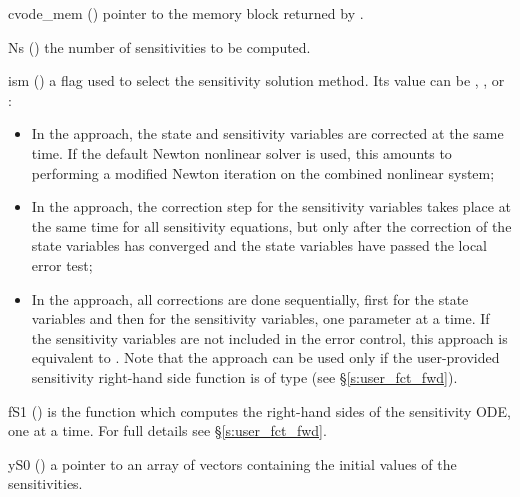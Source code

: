 {
  \begin{args}

  \item[cvode\_mem] ()
    pointer to the {\cvodes} memory block returned by .

  \item[Ns] () 
    the number of sensitivities to be computed.

  \item[ism] ()
    a flag used to select the sensitivity solution method. Its value can 
    be , , or :
    \begin{itemize}
    \item In the  approach, the state and sensitivity
      variables are corrected at the same time. If the default Newton nonlinear
      solver is used, this amounts to performing a modified Newton iteration on
      the combined nonlinear system;
    \item In the  approach, the correction step for the sensitivity
      variables takes place at the same time for all sensitivity equations, but only after 
      the correction of the state variables has converged and the state variables 
      have passed the local error test; 
    \item In the  approach, all corrections are done sequentially, first
      for the state variables and then for the sensitivity variables, one parameter at
      a time. If the sensitivity variables are not included in the error control, this 
      approach is equivalent to . Note that the  approach 
      can be used only if the user-provided sensitivity right-hand side function is of type
       (see \S\ref{s:user_fct_fwd}).
    \end{itemize}

  \item[fS1] ()
    is the {\CC} function which computes the right-hand sides of the sensitivity ODE, one
    at a time. For full details see \S\ref{s:user_fct_fwd}.

  \item[yS0] () 
    a pointer to an array of  vectors containing the initial 
    values of the sensitivities.

  \end{args}
}
